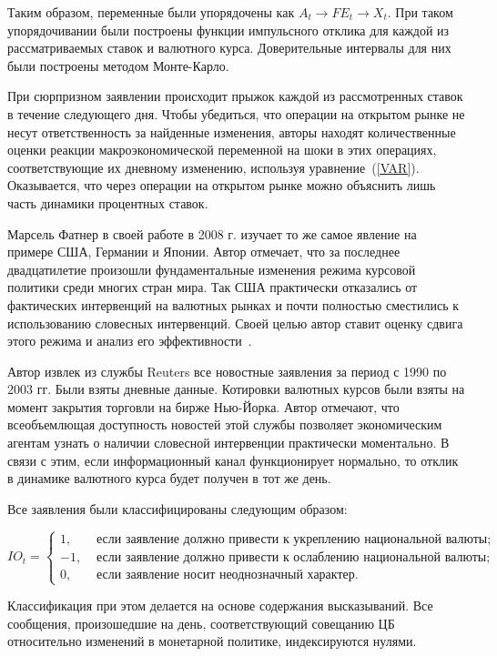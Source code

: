 \documentclass[14pt,a4paper, oneside]{extreport}
\theoremstyle{plain}              %
\theoremstyle{definition}         %
\begin{document}
Таким образом, переменные были упорядочены как $A_t \to  FE_t \to X_t$. При таком упорядочивании были построены функции импульсного отклика для каждой из рассматриваемых ставок и валютного курса. Доверительные интервалы для них были построены методом Монте-Карло.

При сюрпризном заявлении происходит прыжок каждой из рассмотренных ставок в течение следующего дня. Чтобы убедиться, что операции на открытом рынке не несут ответственность за найденные изменения, авторы находят количественные оценки реакции макроэкономической переменной на шоки в этих операциях, соответствующие их дневному изменению, используя уравнение~(\ref{VAR}). 
Оказывается, что через операции на открытом рынке можно объяснить лишь часть динамики процентных ставок. 


Марсель Фатнер в своей работе в 2008 г. изучает то же самое явление на примере США, Германии и Японии. Автор отмечает, что за последнее двадцатилетие произошли фундаментальные изменения режима курсовой политики среди многих стран мира. Так США практически отказались от фактических интервенций на валютных рынках и почти полностью сместились к использованию словесных интервенций. Своей целью автор ставит оценку сдвига этого режима и анализ его эффективности~\cite{fratzscher2008communication}. 

 Автор извлек из службы Reuters все новостные заявления за период с 1990 по 2003 гг. Были взяты дневные данные. Котировки валютных курсов были взяты на момент закрытия торговли на бирже Нью-Йорка. Автор отмечают, что всеобъемлющая доступность новостей этой службы позволяет экономическим агентам узнать о наличии словесной интервенции  практически моментально. В связи с этим, если информационный канал функционирует нормально, то отклик в динамике валютного курса будет получен в тот же день.

Все заявления были классифицированы следующим образом:

\[IO_t = \begin{cases}
1,&\text{ если заявление должно привести к укреплению национальной валюты};\\
-1,&\text{ если заявление должно привести к ослаблению национальной валюты};\\
0,&\text{  если заявление носит неоднозначный характер.}
\end{cases}
\]

Классификация при этом делается на основе содержания высказываний. Все сообщения, произошедшие на день, соответствующий совещанию ЦБ относительно изменений в монетарной политике, индексируются нулями. 
\end{document}
